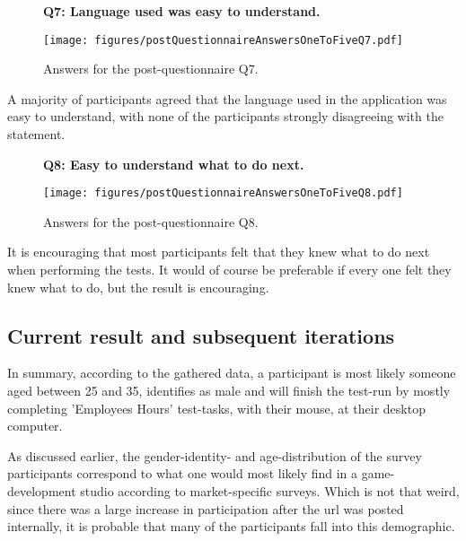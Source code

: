     \begin{figure}[h!]
      \textbf{Q7: Language used was easy to understand.}
      \begin{center}
        \texttt{[image: figures/postQuestionnaireAnswersOneToFiveQ7.pdf]}
        \caption{Answers for the post-questionnaire Q7.}
      \end{center}
    \end{figure}

    A majority of participants agreed that the language used in the
    application was easy to understand, with none of the participants
    strongly disagreeing with the statement.

    \begin{figure}[h!]
      \textbf{Q8: Easy to understand what to do next.}
      \begin{center}
        \texttt{[image: figures/postQuestionnaireAnswersOneToFiveQ8.pdf]}
        \caption{Answers for the post-questionnaire Q8.}
      \end{center}
    \end{figure}

    It is encouraging that most participants felt that they knew what to do
    next when performing the tests. It would of course be preferable if
    every one felt they knew what to do, but the result is encouraging.

  \subsection{Current result and subsequent iterations}

  In summary, according to the gathered data, a participant is most likely
  someone aged between 25 and 35, identifies as male and will finish the
  test-run by mostly completing 'Employees Hours' test-tasks, with their mouse,
  at their desktop computer.

  As discussed earlier, the gender-identity- and age-distribution of the
  survey participants correspond to what one would most likely find in a
  game-development studio according to market-specific
  surveys\cite{citeIndex2019}. Which is not that weird, since there was a large
  increase in participation after the url was posted internally, it is probable
  that many of the participants fall into this demographic.


